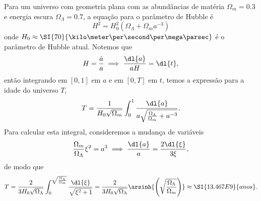 Para um universo com geometria plana com as abundâncias de matéria \(\Omega_m = 0.3\) e energia escura \(\Omega_{\Lambda} = 0.7\), a equação para o parâmetro de Hubble é
\begin{equation*}
    H^2 = H_0^2\left(\Omega_{\Lambda} + \Omega_m a^{-3}\right)
\end{equation*}
onde \(H_0 \approx \SI{70}{\kilo\meter\per\second\per\mega\parsec}\) é o parâmetro de Hubble atual. Notemos que
\begin{equation*}
    H = \frac{\dot{a}}{a} \implies \frac{\dl{a}}{aH} = \dl{t},
\end{equation*}
então integrando em \([0,1]\) em \(a\) e em \([0,T]\) em \(t\), temos a expressão para a idade do universo \(T\),
\begin{equation*}
    T = \frac{1}{H_0\sqrt{\Omega_m}}\int_{0}^{1} \frac{\dl{a}}{a\sqrt{\frac{\Omega_{\Lambda}}{\Omega_m} + a^{-3}}}.
\end{equation*}
Para calcular esta integral, consideremos a mudança de variáveis
\begin{equation*}
    \frac{\Omega_{m}}{\Omega_{\Lambda}}\xi^2 = a^3 \implies \frac{\dl{a}}{a} = \frac{2\dl{\xi}}{3\xi},
\end{equation*}
de modo que
\begin{equation*}
    T = \frac{2}{3H_0 \sqrt{\Omega_\Lambda}} \int_0^{\sqrt{\frac{\Omega_{\Lambda}}{\Omega_m}}}\frac{\dl{\xi}}{\sqrt{\xi^2 + 1}} = \frac{2}{3H_0 \sqrt{\Omega_\Lambda}} \arsinh{\left(\sqrt{\frac{\Omega_{\Lambda}}{\Omega_m}}\right)} \approx \SI{13.467E9}{anos}.
\end{equation*}
